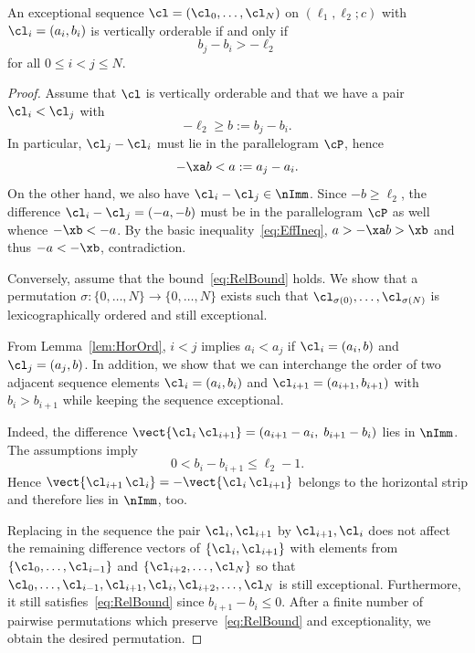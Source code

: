 \begin{prop}
\label{prop:RelCrit}
An exceptional sequence 
$\cl=(\cl_0,\ldots,\cl_N)$ on
$(\ell_1,\ell_2;c)$ with 
$\cl_i=(a_i,b_i)$ is vertically 
orderable if and only if 
\begin{equation}\label{eq:RelBound}
b_j-b_i>-\ell_2
\end{equation}
for all $0\leq i<j\leq N$. 
\end{prop}

\begin{proof}
Assume that $\cl$ is vertically 
orderable and that we have a pair 
$\cl_i<\cl_j$ with
$$
-\ell_2\geq b:=b_j-b_i.
$$
In particular, 
{$\cl_j-\cl_i$ must lie in the parallelogram $\cP$, hence}
$$
-\xa b<a:=a_j-a_i.
$$
On the other hand, we also have 
$\cl_i-\cl_j\in\nImm$. Since 
$-b\geq\ell_2$, the difference 
$\cl_i-\cl_j=(-a,-b)$ must be  
in the parallelogram $\cP$ {as well whence} $-\xb<-a$. By the basic inequality~\eqref{eq:EffIneq}, 
$a>-\xa b>\xb$ {and thus} $-a<-\xb$, 
contradiction.

Conversely, assume that the 
bound~\eqref{eq:RelBound} holds. 
We show that a permutation 
$\sigma\colon \{0,\ldots,N\}\to\{0,\ldots,N\}$ {exists} 
such that 
$\cl_{\sigma(0)},\ldots,\cl_{\sigma(N)}$ 
is lexicographically ordered and still exceptional.

From Lemma~\ref{lem:HorOrd}, $i<j$ 
implies $a_i<a_j$ if $\cl_i=(a_i,b)$ 
and $\cl_j=(a_j,b)$. In addition, we 
show that we can interchange the order 
of two adjacent sequence elements 
$\cl_i=(a_i,b_i)$ and 
$\cl_{i+1}=(a_{i+1},b_{i+1})$ with 
$b_i>b_{i+1}$ while keeping the 
sequence exceptional.

Indeed, the difference 
$\vect{\cl_i\,\cl_{i+1}}=(a_{i+1}-a_i,\; b_{i+1}-b_i)$ 
lies in $\nImm$. The assumptions 
imply
$$
0<b_i-b_{i+1}\leq\ell_2-1.
$$
Hence 
$\vect{\cl_{i+1}\,\cl_i}=-\vect{\cl_i\,\cl_{i+1}}$ 
belongs to the horizontal strip 
and therefore lies in $\nImm$, too.

Replacing in the sequence the 
pair $\cl_i,\cl_{i+1}$ by $\cl_{i+1},\cl_i$ 
does not affect the remaining difference 
vectors of $\{\cl_i,\cl_{i+1}\}$ with 
elements from $\{\cl_0,\ldots,\cl_{i-1}\}$ 
and $\{\cl_{i+2},\ldots,\cl_N\}$ so that 
$\cl_0,\ldots,\cl_{i-1},\cl_{i+1},\cl_i,
\cl_{i+2},\ldots,\cl_N$ is still exceptional. 
Furthermore, it still satisfies~\eqref{eq:RelBound} 
since $b_{i+1}-b_i\leq0$. After a finite 
number of pairwise permutations which 
preserve~\eqref{eq:RelBound} and exceptionality, 
we obtain the desired permutation.
\end{proof}


